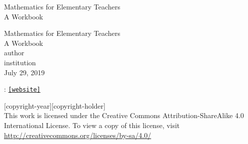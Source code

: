 \documentclass[twoside,11pt,]{book}
\newcommand{\mono}[1]{\texttt{#1}}
\begin{document}
\frontmatter
\thispagestyle{empty}
{\centering
\vspace*{0.28\textheight}
{\Huge Mathematics for Elementary Teachers}\\[2\baselineskip]
{\LARGE A Workbook}\\
}
\clearpage
\thispagestyle{empty}
\null%
\clearpage
\thispagestyle{empty}
{\centering
\vspace*{0.14\textheight}
{\Huge Mathematics for Elementary Teachers}\\[\baselineskip]
{\LARGE A Workbook}\\[3\baselineskip]
{\Large \textbraceleft{}author\textbraceright{}}\\[0.5\baselineskip]
{\Large \textbraceleft{}institution\textbraceright{}}\\[3\baselineskip]
{\Large July 29, 2019}\\}
\clearpage
\thispagestyle{empty}
\hypertarget{g:colophon:idm533872380464}{}
: \href{[website]}{\mono{[website]}}\par\medskip
\noindent\textcopyright{}[copyright-year]\quad{}[copyright-holder]\\[0.5\baselineskip]
 This work is licensed under the Creative Commons Attribution-ShareAlike 4.0 International License. To view a copy of this license, visit \href{http://creativecommons.org/licenses/by-sa/4.0/}{http:\slash{}\slash{}creativecommons.org\slash{}licenses\slash{}by-sa\slash{}4.0\slash{}}\par\medskip
{}
\null\clearpage
\setcounter{tocdepth}{2}
\renewcommand*\contentsname{Contents}
\tableofcontents
\mainmatter
%
%
\typeout{************************************************}
\typeout{************************************************}
%
\end{document}
